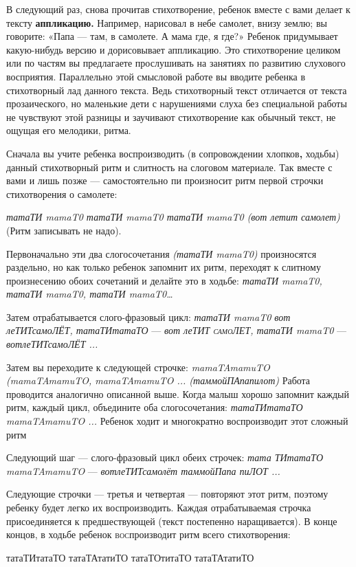 \documentclass[a5paper]{book}
\renewcommand{\emph}[1]{\textit{#1}}
\begin{document}
В следующий раз, снова прочитав стихотворение, ребенок вместе с вами
делает к тексту \textbf{аппликацию.} Например, нарисовал в небе самолет,
внизу землю; вы говорите: «Папа --- там, в самолете. А мама где, я где?»
Ребенок придумывает какую-нибудь версию и дорисовывает аппликацию. Это
стихотворение целиком или по частям вы предлагаете прослушивать на
занятиях по развитию слухового восприятия. Параллельно этой смысловой
работе вы вводите ребенка в стихотворный лад данного текста. Ведь
стихотворный текст отличается от текста прозаического, но маленькие дети
с нарушениями слуха без специальной работы не чувствуют этой разницы и
заучивают стихотворение как обычный текст, не ощущая его мелодики,
ритма.

Сначала вы учите ребенка воспроизводить (в сопровождении
хлопков\textbf{,} ходьбы) данный стихотворный ритм и слитность на
слоговом материале. Так вместе с вами и лишь позже --- самостоятельно пи
произносит ритм первой строчки стихотворения о самолете:

\emph{татаТИ mamaT0 татаТИ mamaT0 татаТИ mamaT0 (вот летит самолет)}
(Ритм записывать не надо).

Первоначально эти два слогосочетания \emph{(татаТИ mamaT0)} произносятся
раздельно, но как только ребенок запомнит их ритм, переходят к слитному
произнесению обоих сочетаний и делайте это в ходьбе: \emph{татаТИ
mamaT0, татаТИ mamaT0, татаТИ mamaT0\ldots{}}

Затем отрабатывается слого-фразовый цикл: \emph{татаТИ mamaT0 вот
леТИТсамоЛЁТ, татаТИтатаТО} --- \emph{вот леТИТ \textsc{самоЛЕТ,} татаТИ
mamaT0} --- \emph{вотлеТИТсамоЛЁТ ...}

Затем вы переходите к следующей строчке: \emph{mamaTAmamuTO
(mamaTAmamuTO, mamaTAmamuTO ... (таммойПАпапилот)} Работа проводится
аналогично описанной выше. Когда малыш хорошо запомнит каждый ритм,
каждый цикл, объедините оба слогосочетания: \emph{татаТИтатаТО
mamaTAmamuTO ...} Ребенок ходит и многократно воспроизводит этот сложный
ритм

Следующий шаг --- слого-фразовый цикл обеих строчек: \emph{тата ТИтатаТО
mamaTAmamuTO} --- \emph{вотлеТИТсамолёт таммойПапа пиЛОТ ...}

Следующие строчки --- третья и четвертая --- повторяют этот ритм,
поэтому ребенку будет легко их воспроизводить. Каждая отрабатываемая
строчка присоединяется к предшествующей (текст постепенно наращивается).
В конце концов, в ходьбе ребенок \textsc{вос}производит ритм всего
стихотворения:

татаТИтатаТО татаТАтатиТО татаТОтитаТО татаТАтатиТО
\end{document}
